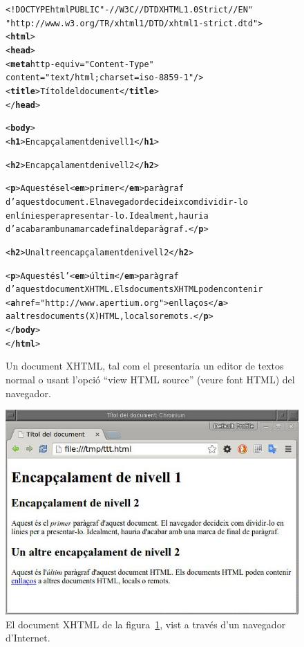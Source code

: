 \begin{figure}
\begin{center}
\begin{alltt}
<!DOCTYPE html PUBLIC "-//W3C//DTD XHTML 1.0 Strict//EN"
      "http://www.w3.org/TR/xhtml1/DTD/xhtml1-strict.dtd">
<\textbf{html}>
  <\textbf{head}>
    <\textbf{meta} http-equiv="Content-Type"
          content="text/html; charset=iso-8859-1"/>
    <\textbf{title}>Títol del document</\textbf{title}>
  </\textbf{head}>

  <\textbf{body}>
    <\textbf{h1}>Encapçalament de nivell 1</\textbf{h1}>

    <\textbf{h2}>Encapçalament de nivell 2</\textbf{h2}>

    <\textbf{p}>Aquest és el <\textbf{em}>primer</\textbf{em}> paràgraf 
    d'aquest document. El navegador decideix com dividir-lo 
    en línies per a presentar-lo. Idealment, hauria 
    d'acabar amb una marca de final de paràgraf. </\textbf{p}>

    <\textbf{h2}>Un altre encapçalament de nivell 2</\textbf{h2}>

    <\textbf{p}>Aquest és l'<\textbf{em}>últim</\textbf{em}> paràgraf 
    d'aquest document XHTML. Els documents XHTML poden contenir 
    <\textbf{a} href="http://www.apertium.org">enllaços</\textbf{a}> 
    a altres documents (X)HTML, locals o remots. </\textbf{p}>
  </\textbf{body}>
</\textbf{html}>
\end{alltt}
\end{center}
\caption{Un document XHTML, tal com el presentaria un editor de textos
  normal o usant l'opció ``view HTML source'' (veure font HTML) del
  navegador.}
\label{fg:HTML}
\end{figure}

\begin{figure}
\begin{center}
\includegraphics[scale=0.5]{vista-chromium.jpg}
  \end{center}
  \caption{El document XHTML de la figura~\protect\ref{fg:HTML}, vist
    a través d'un navegador d'Internet.}
\label{fg:HTMLnav}
\end{figure}

